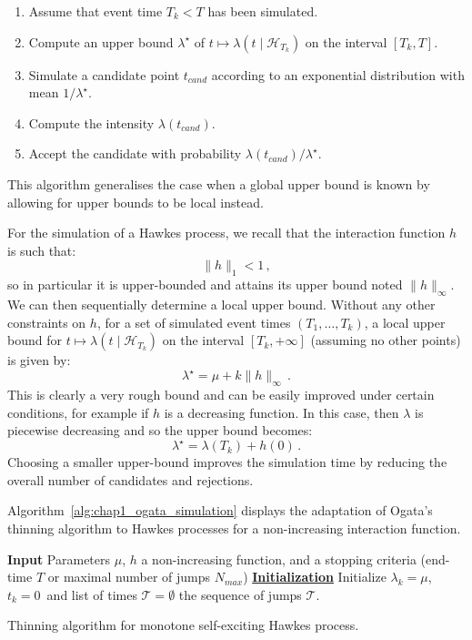 \begin{enumerate}
\item Assume that event time $T_k < T$ has been simulated.
\item Compute an upper bound $\lambda^\star$ of $t\mapsto \lambda(t\mid\mathcal{H}_{T_k})$ on the interval $[T_k, T]$.
\item Simulate a candidate point $t_{cand}$ according to an exponential distribution with mean $1 / \lambda^\star$.
\item Compute the intensity $\lambda(t_{cand})$.
\item Accept the candidate with probability $\lambda(t_{cand}) / \lambda^\star$.
\end{enumerate}
This algorithm generalises the case when a global upper bound is known by allowing for upper bounds to be local instead.

For the simulation of a Hawkes process, we recall that the interaction function $h$ is such that:
\[\|h\|_1 < 1\,,\]
so in particular it is upper-bounded and attains its upper bound noted $\|h\|_{\infty}$. We can then sequentially determine a local upper bound. Without any other constraints on $h$, for a set of simulated event times $(T_1, \ldots, T_k)$, a local upper bound for $t\mapsto \lambda(t\mid\mathcal{H}_{T_k})$ on the interval $[T_k, +\infty]$ (assuming no other points) is given by:
\[\lambda^\star = \mu + k\|h\|_{\infty}\,.\]
This is clearly a very rough bound and can be easily improved under certain conditions, for example if $h$ is a decreasing function. In this case, then $\lambda$ is piecewise decreasing and so the upper bound becomes:
\[\lambda^\star = \lambda(T_k) + h(0)\,.\]
Choosing a smaller upper-bound improves the simulation time by reducing the overall number of candidates and rejections.

Algorithm~\ref{alg:chap1_ogata_simulation} displays the adaptation of Ogata's thinning algorithm to Hawkes processes for a non-increasing interaction function.

\begin{algorithm}[!ht]
    \SetAlgoLined
     \textbf{Input} Parameters $\mu$, $h$ a non-increasing function, and a stopping criteria (end-time $T$ or maximal number of jumps $N_{max}$)\;
     \textbf{\underline{Initialization}} Initialize $\lambda_k =\mu$, $t_k=0$\ and list of times $\mathcal{T} = \emptyset$\;
     \Return the sequence of jumps $\mathcal{T}$.
     \caption{Thinning algorithm for monotone self-exciting Hawkes process.}
     \label{alg:chap1_ogata_simulation}
\end{algorithm}

